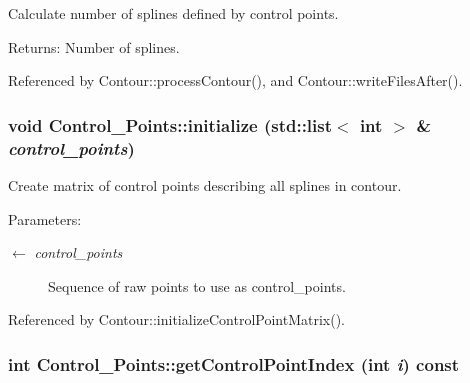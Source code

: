 Calculate number of splines defined by control points. \begin{Desc}
\item[Returns:]Number of splines. \end{Desc}


Referenced by Contour::processContour(), and Contour::writeFilesAfter().\hypertarget{classControl__Points_7d33201ade6e5fb8052a2aa481a640ba}{
\subsubsection[initialize]{\setlength{\rightskip}{0pt plus 5cm}void Control\_\-Points::initialize (std::list$<$ int $>$ \& {\em control\_\-points})}}
\label{classControl__Points_7d33201ade6e5fb8052a2aa481a640ba}


Create matrix of control points describing all splines in contour. \begin{Desc}
\item[Parameters:]
\begin{description}
\item[\mbox{$\leftarrow$} {\em control\_\-points}]Sequence of raw points to use as control\_\-points. \end{description}
\end{Desc}


Referenced by Contour::initializeControlPointMatrix().\hypertarget{classControl__Points_e5ba1b63a5096969cae1ad01c0ee5b38}{
\subsubsection[getControlPointIndex]{\setlength{\rightskip}{0pt plus 5cm}int Control\_\-Points::getControlPointIndex (int {\em i}) const}}
\label{classControl__Points_e5ba1b63a5096969cae1ad01c0ee5b38}


